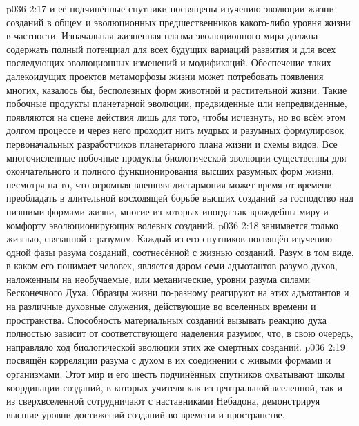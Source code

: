\vs p036 2:17 \pc {} и её подчинённые спутники посвящены изучению эволюции жизни созданий в общем и эволюционных предшественников какого\hyp{}либо уровня жизни в частности. Изначальная жизненная плазма эволюционного мира должна содержать полный потенциал для всех будущих вариаций развития и для всех последующих эволюционных изменений и модификаций. Обеспечение таких далекоидущих проектов метаморфозы жизни может потребовать появления многих, казалось бы, бесполезных форм животной и растительной жизни. Такие побочные продукты планетарной эволюции, предвиденные или непредвиденные, появляются на сцене действия лишь для того, чтобы исчезнуть, но во всём этом долгом процессе и через него проходит нить мудрых и разумных формулировок первоначальных разработчиков планетарного плана жизни и схемы видов. Все многочисленные побочные продукты биологической эволюции существенны для окончательного и полного функционирования высших разумных форм жизни, несмотря на то, что огромная внешняя дисгармония может время от времени преобладать в длительной восходящей борьбе высших созданий за господство над низшими формами жизни, многие из которых иногда так враждебны миру и комфорту эволюционирующих волевых созданий.
\vs p036 2:18 \pc {} занимается только жизнью, связанной с разумом. Каждый из его спутников посвящён изучению одной фазы разума созданий, соотнесённой с жизнью созданий. Разум в том виде, в каком его понимает человек, является даром семи адъютантов разумо\hyp{}духов, наложенным на необучаемые, или механические, уровни разума силами Бесконечного Духа. Образцы жизни по\hyp{}разному реагируют на этих адъютантов и на различные духовные служения, действующие во вселенных времени и пространства. Способность материальных созданий вызывать реакцию духа полностью зависит от соответствующего наделения разумом, что, в свою очередь, направляло ход биологической эволюции этих же смертных созданий.
\vs p036 2:19 \pc {} посвящён корреляции разума с духом в их соединении с живыми формами и организмами. Этот мир и его шесть подчинённых спутников охватывают школы координации созданий, в которых учителя как из центральной вселенной, так и из сверхвселенной сотрудничают с наставниками Небадона, демонстрируя высшие уровни достижений созданий во времени и пространстве.
